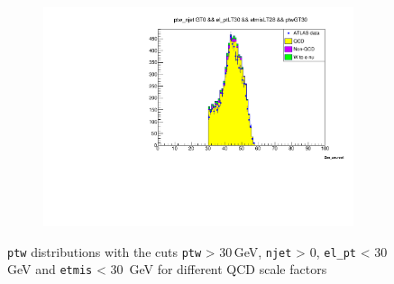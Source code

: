 \begin{figure}[H]
\begin{subfigure}{0.5\textwidth}
            \includegraphics[width=\textwidth]{../W_mass/final_ptw_qcd0-37.pdf}
        \end{subfigure}
        \caption{\texttt{ptw} distributions with the cuts \texttt{ptw} > 30\,GeV, \texttt{njet} > 0, \texttt{el\_pt} < 30\, GeV and \texttt{etmis} < 30\, GeV for different QCD
        scale factors}
        \label{fig:final_ptw}
    \end{figure}

